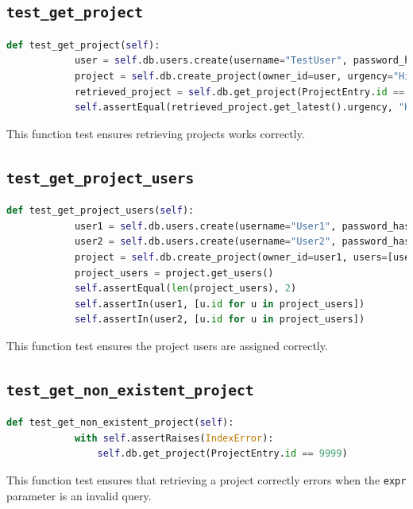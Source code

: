\documentclass{report}
\begin{document}
	\subsection{\texttt{test\_get\_project}}
	\vspace{1em}
	\begin{lstlisting}[language=Python]
		def test_get_project(self):
			user = self.db.users.create(username="TestUser", password_hash="TestHash")
			project = self.db.create_project(owner_id=user, urgency="High")
			retrieved_project = self.db.get_project(ProjectEntry.id == project.id)
			self.assertEqual(retrieved_project.get_latest().urgency, "High")
	\end{lstlisting}
	\vspace{1em}
	This function test ensures retrieving projects works correctly.
	
	\subsection{\texttt{test\_get\_project\_users}}
	\vspace{1em}
	\begin{lstlisting}[language=Python]
		def test_get_project_users(self):
			user1 = self.db.users.create(username="User1", password_hash="Hash1")
			user2 = self.db.users.create(username="User2", password_hash="Hash2")
			project = self.db.create_project(owner_id=user1, users=[user2])
			project_users = project.get_users()
			self.assertEqual(len(project_users), 2)
			self.assertIn(user1, [u.id for u in project_users])
			self.assertIn(user2, [u.id for u in project_users])
	\end{lstlisting}
	\vspace{1em}
	This function test ensures the project users are assigned correctly.
	
	\subsection{\texttt{test\_get\_non\_existent\_project}}
	\vspace{1em}
	\begin{lstlisting}[language=Python]
		def test_get_non_existent_project(self):
			with self.assertRaises(IndexError):
				self.db.get_project(ProjectEntry.id == 9999)
	\end{lstlisting}
	\vspace{1em}
	This function test ensures that retrieving a project correctly errors when the
	\verb|expr| parameter is an invalid query.
	
\end{document}
